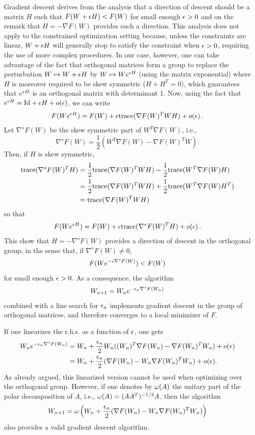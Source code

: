 Gradient descent derives from the analysis that a direction of descent should be a matrix $H$ such that $F(W + \epsilon H) < F(W)$ for small enough $\epsilon>0$ and on the remark that $H = -\nabla F(W)$ provides such a direction. This analysis does not apply to the constrained optimization setting because, unless the constraints are linear, $W+\epsilon H$ will generally stop to satisfy the constraint when $\epsilon >0$, requiring the use of more complex procedures. In our case, however, one can take advantage of the fact that orthogonal matrices form a group to replace the perturbation $W \mapsto W + \epsilon H$ by $W \mapsto We^{\epsilon H}$ (using the matrix exponential) where $H$ is moreover required to be skew symmetric ($H+H^T=0)$, which guarantees that $e^{\epsilon H}$ is an orthogonal matrix with determinant 1. Now, using the fact that $e^{\ep H} = \Id + \ep H + o(\ep)$, we can write
\[
F(We^{\epsilon H}) = F(W) + \epsilon {\mathrm{trace}}(\nabla F(W)^T WH) + o(\epsilon)\,.
\]
Let $\nabla^s F(W)$ be the skew symmetric part of $W^T\nabla F(W)$, i.e., 
\[
\nabla^s F(W) = \frac12 (W^T\nabla F(W) - \nabla F(W)^TW).
\]
Then, if $H$ is skew symmetric, 
\begin{align*}
{\mathrm{trace}}(\nabla^s F(W)^T H) &= \frac12 {\mathrm{trace}}(\nabla F(W)^T WH) - \frac12 {\mathrm{trace}}(W^T\nabla F(W) H) \\
&=  \frac12 {\mathrm{trace}}(\nabla F(W)^T WH) + \frac12 {\mathrm{trace}}(W^T\nabla F(W) H^T)\\
& = {\mathrm{trace}}(\nabla F(W)^T WH) 
\end{align*}
so that 
\[
F(We^{\epsilon H}) = F(W) + \epsilon {\mathrm{trace}}(\nabla^s F(W)^T H) + o(\epsilon)\,.
\]
This show that $H = - \nabla^s F(W)$ provides a direction of descent in the orthogonal group, in the sense that, if $\nabla^s F(W) \neq 0$, 
\[
F(We^{-\epsilon\nabla^s F(W)}) < F(W)
\]
for small enough $\epsilon > 0$. As a consequence, the algorithm 
\[
W_{n+1} = W_n  e^{-\epsilon_n\nabla^s F(W_n)}
\]
combined with a line search for $\epsilon_n$ implements gradient descent in the group of orthogonal matrices, and therefore converges to a local minimizer of $F$. 

If one linearizes the r.h.s. as a function of $\epsilon$, one gets
\begin{align*}
W_n  e^{-\epsilon_n\nabla^s F(W_n)} &=  W_n + \frac{\epsilon_n} 2 W_n( (W_n)^T\nabla F(W_n) - \nabla F(W_n)^TW_n) + o(\epsilon)\\
& = W_n + \frac{\epsilon_n} 2 ( \nabla F(W_n) - W_n\nabla F(W_n)^TW_n) + o(\epsilon).
\end{align*}
As already argued, this linearized version cannot be used when optimizing over the orthogonal group. However, if one denotes by $\omega(A)$ the unitary part of the polar decomposition of $A$, i.e., $\omega(A) = (AA^T)^{-1/2}A$, then the algorithm
\[
W_{n+1} = \omega\left(W_n + \frac{\epsilon_n} 2 ( \nabla F(W_n) - W_n\nabla F(W_n)^TW_n)\right)
\]
also provides a valid gradient descent algorithm.
\bigskip

